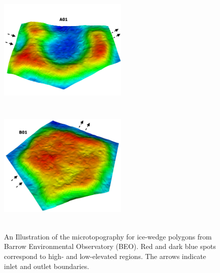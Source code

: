 \documentclass[review,11pt]{elsarticle}
\begin{document}
\begin{figure}
\includegraphics[width=6.2cm, height=6cm]{./figures/3DPolygonsImages/3DpolygonA01-3B.png}
\includegraphics[width=6.2cm, height=6cm]{./figures/3DPolygonsImages/3DpolygonB01-3B.png}
\caption{An Illustration of the microtopography for ice-wedge polygons from Barrow Environmental Observatory (BEO). Red and dark blue spots correspond to high- and low-elevated regions. The arrows indicate inlet and outlet boundaries.}
\label{IWP-finescale}
\end{figure}
\end{document}
